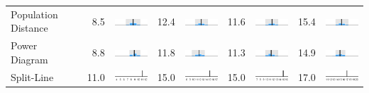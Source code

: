 \begin{table}
\begin{tabular}{l rm{7em} rm{7em} rm{7em} rm{7em}}
Population Distance    &   8.5 &       \includegraphics[width=7em]{mini_hist/TX_2004_dist_p} &  12.4 &       \includegraphics[width=7em]{mini_hist/TX_2008_dist_p} &  11.6 &       \includegraphics[width=7em]{mini_hist/TX_2012_dist_p} &  15.4 &       \includegraphics[width=7em]{mini_hist/TX_2016_dist_p} \\
Power Diagram          &   8.8 &        \includegraphics[width=7em]{mini_hist/TX_2004_power} &  11.8 &        \includegraphics[width=7em]{mini_hist/TX_2008_power} &  11.3 &        \includegraphics[width=7em]{mini_hist/TX_2012_power} &  14.9 &        \includegraphics[width=7em]{mini_hist/TX_2016_power} \\
Split-Line             &  11.0 &        \includegraphics[width=7em]{mini_hist/TX_2004_split_ax} &  15.0 &        \includegraphics[width=7em]{mini_hist/TX_2008_split_ax} &  15.0 &        \includegraphics[width=7em]{mini_hist/TX_2012_split_ax} &  17.0 &        \includegraphics[width=7em]{mini_hist/TX_2016_split_ax} \\

\end{tabular}
\end{table}
